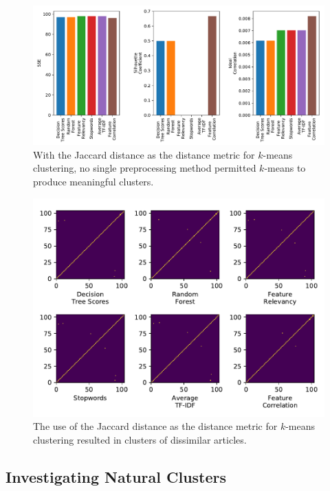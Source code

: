 \documentclass[11pt]{article}
\begin{document}
\begin{figure}[h!] \label{fig:something}
  \centering
  \includegraphics[width=\textwidth]{figures/hw3/jaccard/feature_subset_selection}
  \caption{With the Jaccard distance as the distance metric for $k$-means clustering, no single preprocessing method permitted $k$-means to produce meaningful clusters.}
\end{figure}

\begin{figure}[h!] \label{fig:something}
  \centering
  \includegraphics[width=\textwidth]{figures/hw3/jaccard/similarity_matrices}
  \caption{The use of the Jaccard distance as the distance metric for $k$-means clustering resulted in clusters of dissimilar articles.}
\end{figure}



\subsection{Investigating Natural Clusters} \label{sec:natural}
\end{document}
